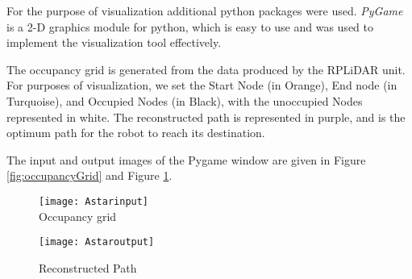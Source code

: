 For the purpose of visualization additional python packages were used. \emph{PyGame} is a 2-D graphics module for python, which is easy to use and was used to implement the visualization tool effectively. 

The occupancy grid is generated from the data produced by the RPLiDAR unit. For purposes of visualization, we set the Start Node (in Orange), End node (in Turquoise), and Occupied Nodes (in Black), with the unoccupied Nodes represented in white. The reconstructed path is represented in purple, and is the optimum path for the robot to reach its destination.

The input and output images of the Pygame window are given in Figure \ref{fig:occupancyGrid} and Figure \ref{fig:reconstructedPath}.\\

\begin{figure}
    \begin{multicols}{2}
    \centering
        \texttt{[image: Astarinput]}\\
        \caption{Occupancy grid}
        \label{fig:occupancyGrid}

        \texttt{[image: Astaroutput]}\\
        \caption{Reconstructed Path}
        \label{fig:reconstructedPath}
    \end{multicols}
\end{figure}





